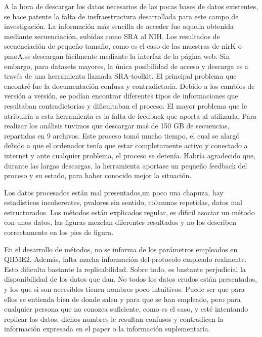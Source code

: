 \documentclass{article}
\begin{document}
A la hora de descargar los datos necesarios de las pocas bases de datos existentes, se hace patente la falta de insfraestructura desarrollada para este campo de investigación. La información más sencilla de acceder fue aquella obtenida mediante secuenciación, subidas como SRA al NIH. Los resultados de secuenciación de pequeño tamaño, como es el caso de las muestras de nirK o pmoA,se descargan fácilmente mediante la interfaz de la página web. Sin embargo, para datasets mayores, la única posibilidad de acceso y descarga es a través de una herramienta llamada SRA-toolkit. El principal problema que encontré fue la documentación confusa y contradictoria. Debido a los cambios de versión a versión, se podían encontrar diferentes tipos de informaciones que resultaban contradictorias y dificultaban el proceso. El mayor problema que le atribuiría a esta herramienta es la falta de feedback que aporta al utilizarla. Para realizar los análisis tuvimos que descargar maś de 150 GB de secuencias, repartidas en 9 archivos. Este proceso tomó mucho tiempo, el cual se alargó debido a que el ordenador tenía que estar completamente activo y conectado a internet y ante cualquier problema, el proceso se detenía. Habría agradecido que, durante las largas descargas, la herramienta aportase un pequeño feedback del proceso y su estado, para haber conocido mejor la situación.

Los datos procesados están mal presentados,un poco una chapuza, hay estadísticos incoherentes, pvalores sin sentido, columnas repetidas, datos mal estructurados. Los métodos están explicados regular, es dificil asociar un método con unos datos, las figuras mezclan diferentes resultados y no los describen correctamente en los pies de figura.

En el desarrollo de métodos, no se informa de los parámetros empleados en QIIME2. Además, falta mucha información del protocolo empleado realmente. Esto dificulta bastante la replicabilidad. Sobre todo, es bastante perjudicial la disponibilidad de los datos que dan. No todos los datos crudos están presentados, y los que si son accesibles tienen nombres poco intuitivos. Puede ser que para ellos se entienda bien de donde salen y para que se han empleado, pero para cualquier persona que no conozca suficiente, como es el caso, y esté intentando replicar los datos, dichos nombres le resultan confusos y contradicen la información expresada en el paper o la información suplementaria.
\end{document}
